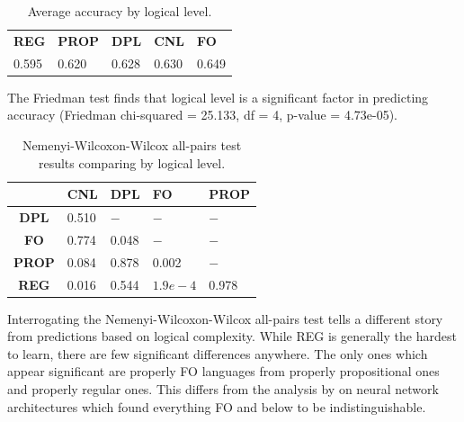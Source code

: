 \documentclass[twoside,11pt]{article}
\newcommand{\tbf}[1]{\textbf{#1}}
\newcommand{\note}[3]{{
    \normalfont
    \noindent
    \textcolor{#1}{\textbf{#2}: #3}
}}
\newcommand{\adil}[1]{\note{Orchid}{Adil}{#1}}
\begin{document}
\begin{table}[ht]
  \centering
  \begin{tabular}{lllll}
    \toprule
    \tbf{REG} & \tbf{PROP} & \tbf{DPL} & \tbf{CNL} & \tbf{FO} \\
    0.595     & 0.620      & 0.628     & 0.630     & 0.649    \\
    \bottomrule
  \end{tabular}
  \caption{Average accuracy by logical level.}
  \label{tab:logical-level-avg}
\end{table}

The Friedman test finds that logical level is a significant factor in predicting accuracy (Friedman chi-squared = 25.133, df = 4, p-value = 4.73e-05).

\begin{table}[ht]
    \centering
    \begin{tabular}{cllll}
    \toprule
               & \tbf{CNL} & \tbf{DPL} & \tbf{FO} & \tbf{PROP} \\
    \midrule
    \tbf{DPL}  & 0.510     & $-$       & $-$      & $-$        \\
    \tbf{FO}   & 0.774     & 0.048     & $-$      & $-$        \\
    \tbf{PROP} & 0.084     & 0.878     & 0.002    & $-$        \\
    \tbf{REG}  & 0.016     & 0.544     & $1.9e-4$ & 0.978      \\
    \bottomrule
    \end{tabular}
    \caption{Nemenyi-Wilcoxon-Wilcox all-pairs test results comparing by logical level.}
    \label{tab:logical-level-nww}
\end{table}
Interrogating the Nemenyi-Wilcoxon-Wilcox all-pairs test tells a different story from predictions based on logical complexity. While REG is generally the hardest to learn, there are few significant differences anywhere. The only ones which appear significant are properly FO languages from properly propositional ones and properly regular ones. This differs from the analysis by \citet{heinz-etal-2022-mlregtest} on neural network architectures which found everything FO and below to be indistinguishable.
\end{document}
